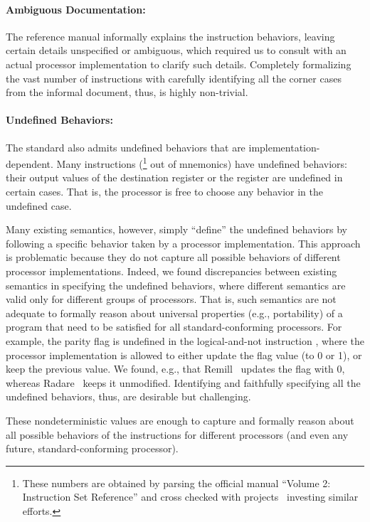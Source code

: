 \paragraph{Ambiguous Documentation:}
%
The \ISA reference manual informally explains the instruction behaviors, leaving certain details unspecified or ambiguous, which required us to consult with an actual processor implementation to clarify such details.
%
Completely formalizing the vast number of instructions with carefully identifying all the corner cases from the informal document, thus, is highly non-trivial.


\paragraph{Undefined Behaviors:}
%
The \ISA standard also admits undefined behaviors that are implementation-dependent.
Many instructions (\undefIntel{}\footnote{\label{note1}These numbers are obtained by parsing the official manual ``Volume 2: Instruction Set Reference'' and cross checked with projects~\cite{Stoke2013, Felix} investing similar efforts.} out of \totalIntel{} mnemonics) have undefined behaviors: their output values of the destination register or the  register are undefined in certain cases.
That is, the processor is free to choose any behavior in the undefined case.


Many existing semantics, however, simply ``define'' the undefined behaviors by
following a specific behavior taken by a processor implementation.
This approach is problematic because they do not capture all possible behaviors of different processor implementations.
Indeed, we found discrepancies between existing semantics in specifying the undefined behaviors, where different semantics are valid only for different groups of processors.
That is, such semantics are not adequate to formally reason about universal properties (e.g., portability) of a program that need to be satisfied for all standard-conforming processors.
%
For example, the parity flag  is undefined in the logical-and-not instruction , where the processor implementation is allowed to either update the flag value (to 0 or 1), or keep the previous value.
We found, e.g., that Remill~\cite{Remill} updates the flag with 0, whereas Radare~\cite{Radare2} keeps it unmodified.
Identifying and faithfully specifying all the undefined behaviors, thus, are desirable but challenging.

These nondeterministic values are enough to capture and formally reason about all possible behaviors of the instructions for different processors (and even any future, standard-conforming processor).

